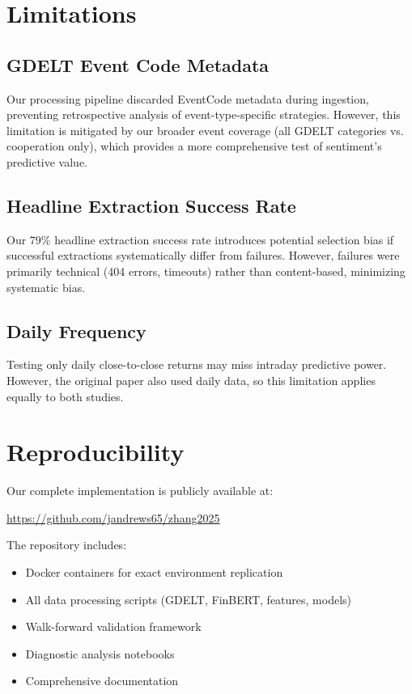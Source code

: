 \documentclass[11pt]{article}
\begin{document}
\section{Limitations}

\subsection{GDELT Event Code Metadata}

Our processing pipeline discarded EventCode metadata during ingestion, preventing retrospective analysis of event-type-specific strategies. However, this limitation is mitigated by our broader event coverage (all GDELT categories vs. cooperation only), which provides a more comprehensive test of sentiment's predictive value.

\subsection{Headline Extraction Success Rate}

Our 79\% headline extraction success rate introduces potential selection bias if successful extractions systematically differ from failures. However, failures were primarily technical (404 errors, timeouts) rather than content-based, minimizing systematic bias.

\subsection{Daily Frequency}

Testing only daily close-to-close returns may miss intraday predictive power. However, the original paper also used daily data, so this limitation applies equally to both studies.

\section{Reproducibility}

Our complete implementation is publicly available at:

\begin{center}
\url{https://github.com/jandrews65/zhang2025}
\end{center}

The repository includes:
\begin{itemize}
    \item Docker containers for exact environment replication
    \item All data processing scripts (GDELT, FinBERT, features, models)
    \item Walk-forward validation framework
    \item Diagnostic analysis notebooks
    \item Comprehensive documentation
\end{itemize}
\end{document}
